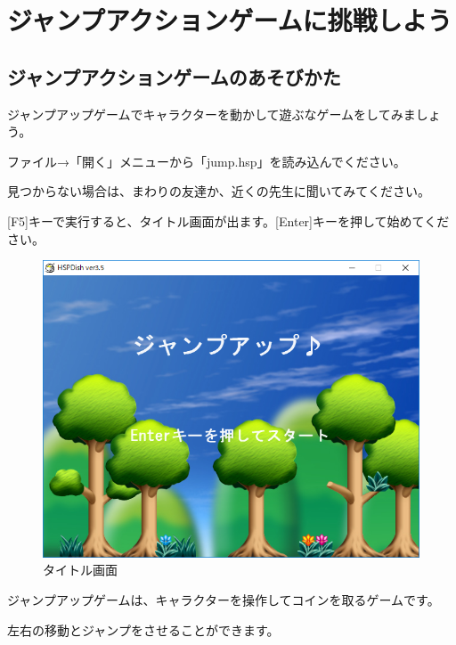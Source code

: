 \newpage

\section{ジャンプアクションゲームに挑戦しよう}


\subsection{ジャンプアクションゲームのあそびかた}



ジャンプアップゲームでキャラクターを動かして遊ぶなゲームをしてみましょう。


ファイル→「開く」メニューから「jump.hsp」を読み込んでください。

見つからない場合は、まわりの友達か、近くの先生に聞いてみてください。

[F5]キーで実行すると、タイトル画面が出ます。[Enter]キーを押して始めてください。


\begin{figure}[H]
    \begin{center}
      \includegraphics[keepaspectratio,width=11.192cm,height=8.827cm]{text04-img/s_jumptitle.png}
      \caption{タイトル画面}
    \end{center}
    \label{fig:prog_menu}
\end{figure}

ジャンプアップゲームは、キャラクターを操作してコインを取るゲームです。

左右の移動とジャンプをさせることができます。



